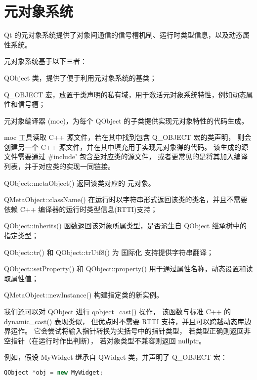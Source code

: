 \chapter{元对象系统}

Qt 的元对象系统提供了对象间通信的信号槽机制、运行时类型信息，以及动态属性系统。

元对象系统基于以下三者：

\begin{compactenum}
\item QObject 类，提供了便于利用元对象系统的基类；
\item Q\_OBJECT 宏，放置于类声明的私有域，用于激活元对象系统特性，例如动态属性和信号槽；
\item 元对象编译器 (moc)，为每个 QObject 的子类提供实现元对象特性的代码生成。
\end{compactenum}

moc 工具读取 C++ 源文件，若在其中找到包含 Q\_OBJECT 宏的类声明，
则会创建另一个 C++ 源文件，并在其中填充用于实现元对象得的代码。
该生成的源文件需要通过 \#include' 包含至对应类的源文件，
或者更常见的是将其加入编译列表，并于对应类的实现一同链接。

\begin{compactitem}[\arr]
\item QObject::metaObject() 返回该类对应的 元对象。
\item QMetaObject::className() 在运行时以字符串形式返回该类的类名，并且不需要依赖 C++ 编译器的运行时类型信息(RTTI)支持；
\item QObject::inherits() 函数返回该对象所属类型，是否派生自 QObject 继承树中的指定类型；
\item QObject::tr() 和 QObject::trUtf8() 为 国际化 支持提供字符串翻译；
\item QObject::setProperty() 和 QObject::property() 用于通过属性名称，动态设置和读取属性值；
\item QMetaObject::newInstance() 构建指定类的新实例。
\end{compactitem}

我们还可以对 QObject 进行 qobject\_cast() 操作，
该函数与标准 C++ 的 dynamic\_cast() 表现类似，
但优点时不需要 RTTI 支持，并且可以跨越动态库边界运作。
它会尝试将输入指针转换为尖括号中的指针类型，
若类型正确则返回非空指针（在运行时作出判断），
若对象类型不兼容则返回 nullptr。

例如，假设 MyWidget 继承自 QWidget 类，并声明了 Q\_OBJECT 宏：

\begin{lstlisting}[language=C++]
QObject *obj = new MyWidget;
\end{lstlisting}


